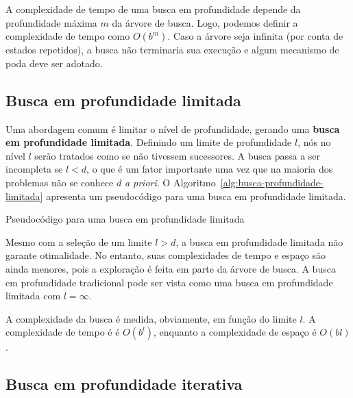 A complexidade de tempo de uma busca em profundidade depende da profundidade máxima $m$ da árvore de busca. Logo, podemos definir a complexidade de tempo como $O(b^m)$. Caso a árvore seja infinita (por conta de estados repetidos), a busca não terminaria sua execução e algum mecanismo de poda deve ser adotado.

\subsection{Busca em profundidade limitada}

Uma abordagem comum é limitar o nível de profundidade, gerando uma \textbf{busca em profundidade limitada}. Definindo um limite de profundidade $l$, nós no nível $l$ serão tratados como se não tivessem sucessores. A busca passa a ser incompleta se $l < d$, o que é um fator importante uma vez que na maioria dos problemas não se conhece $d$ \textit{a priori}. O Algoritmo~\ref{alg:busca-profundidade-limitada} apresenta um pseudocódigo para uma busca em profundidade limitada.

\begin{algorithm}[h]
	\DontPrintSemicolon
	
	
	\caption{Pseudocódigo para uma busca em profundidade limitada}
	\label{alg:busca-profundidade-limitada}
\end{algorithm}

Mesmo com a seleção de um limite $l > d$, a busca em profundidade limitada não garante otimalidade. No entanto, suas complexidades de tempo e espaço são ainda menores, pois a exploração é feita em parte da árvore de busca. A busca em profundidade tradicional pode ser vista como uma busca em profundidade limitada com $l = \infty$.

A complexidade da busca é medida, obviamente, em função do limite $l$. A complexidade de tempo é é $O(b^l)$, enquanto a complexidade de espaço é $O(bl)$.

\subsection{Busca em profundidade iterativa}

